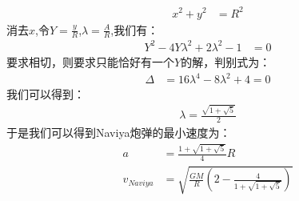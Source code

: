 \begin{enumerate}
\begin{align*}
		x^2 + y^2 &= R^2
	\end{align*}
	消去\(x\),令\(Y=\frac{y}{R}\),\(\lambda = \frac{A}{R}\),我们有：
	\begin{align*}
		Y^2 -4Y\lambda^2+2\lambda^2-1 &= 0 
	\end{align*}
	要求相切，则要求只能恰好有一个\(Y\)的解，判别式为：
	\begin{align*}
		\Delta &= 16\lambda^4 - 8\lambda^2 + 4 =0
	\end{align*}
		我们可以得到：
	\begin{align*}
		\lambda = \frac{\sqrt{1+\sqrt{5}}}{2}
	\end{align*}
	于是我们可以得到Naviya炮弹的最小速度为：
	\begin{align*}
		a &= \frac{1+\sqrt{1+\sqrt{5}}}{4}R \\
		v_{Naviya} &= \sqrt{\frac{GM}{R}(2-\frac{4}{1+\sqrt{1+\sqrt{5}}})} 
	\end{align*}

\end{enumerate}